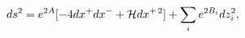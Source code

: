 \begin{equation}
\label{gmetric}
ds^2=e^{2A}[-4dx^+dx^-+{\cal H}dx^{+\,2}]+\sum_ie^{2B_i}dz_i^2,
\end{equation}

